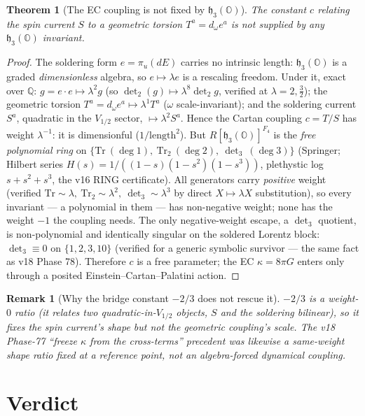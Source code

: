 \documentclass[11pt]{article}
\newtheorem{theorem}{Theorem}
\newtheorem{remark}{Remark}
\newcommand{\Tr}{\mathrm{Tr}}
\newcommand{\h}{\mathfrak{h}}
\newcommand{\Oo}{\mathbb{O}}
\begin{document}
\begin{theorem}[The EC coupling is not fixed by $\h_3(\Oo)$]
The constant $c$ relating the spin current $S$ to a geometric torsion
$T^a=d_\omega e^a$ is not supplied by any $\h_3(\Oo)$ invariant.
\end{theorem}

\begin{proof}
The soldering form $e=\pi_u(dE)$ carries no intrinsic length: $\h_3(\Oo)$ is a graded
\emph{dimensionless} algebra, so $e\mapsto\lambda e$ is a rescaling freedom. Under it,
exact over $\mathbb{Q}$: $g=e\!\cdot\!e\mapsto\lambda^2 g$ (so $\det_2(g)\mapsto
\lambda^8\det_2 g$, verified at $\lambda=2,\tfrac32$); the geometric torsion
$T^a=d_\omega e^a\mapsto\lambda^1 T^a$ ($\omega$ scale-invariant); and the soldering
current $S^a$, quadratic in the $V_{1/2}$ sector, $\mapsto\lambda^2 S^a$. Hence the
Cartan coupling $c=T/S$ has weight $\lambda^{-1}$: it is dimensionful ($1/\text{length}^2$).
But $R[\h_3(\Oo)]^{F_4}$ is the \emph{free polynomial ring} on
$\{\Tr\ (\deg 1),\ \Tr_2\ (\deg 2),\ \det_3\ (\deg 3)\}$ (Springer; Hilbert series
$H(s)=1/((1-s)(1-s^2)(1-s^3))$, plethystic log $s+s^2+s^3$, the v16 RING
certificate). All generators carry \emph{positive} weight (verified
$\Tr\sim\lambda,\ \Tr_2\sim\lambda^2,\ \det_3\sim\lambda^3$ by direct
$X\!\mapsto\!\lambda X$ substitution), so every invariant --- a polynomial in them ---
has non-negative weight; none has the weight $-1$ the coupling needs. The only
negative-weight escape, a $\det_3$ quotient, is non-polynomial and identically
singular on the soldered Lorentz block: $\det_3\equiv0$ on $\{1,2,3,10\}$ (verified for
a generic symbolic survivor --- the same fact as v18 Phase 78). Therefore $c$ is a
free parameter; the EC $\kappa=8\pi G$ enters only through a posited
Einstein--Cartan--Palatini action.
\end{proof}

\begin{remark}[Why the bridge constant $-2/3$ does not rescue it]
$-2/3$ is a \emph{weight-$0$} ratio (it relates two quadratic-in-$V_{1/2}$ objects,
$S$ and the soldering bilinear), so it fixes the spin current's \emph{shape} but not
the geometric coupling's \emph{scale}. The v18 Phase-77 ``freeze $\kappa$ from the
cross-terms'' precedent was likewise a same-weight shape ratio fixed at a reference
point, not an algebra-forced dynamical coupling.
\end{remark}

\section{Verdict}
\end{document}
